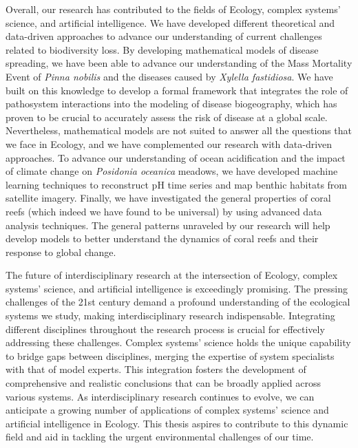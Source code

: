 Overall, our research has contributed to the fields of Ecology, complex
systems' science, and artificial intelligence. We have developed different
theoretical and data-driven approaches to advance our understanding of current
challenges related to biodiversity loss. By developing mathematical models of
disease spreading, we have been able to advance our understanding of the Mass
Mortality Event of \textit{Pinna nobilis} and the diseases caused by
\textit{Xylella fastidiosa}. We have built on this knowledge to develop a
formal framework that integrates the role of pathosystem interactions into the
modeling of disease biogeography, which has proven to be crucial to accurately
assess the risk of disease at a global scale. Nevertheless, mathematical models
are not suited to answer all the questions that we face in Ecology, and we have
complemented our research with data-driven approaches. To advance our
understanding of ocean acidification and the impact of climate change on
\textit{Posidonia oceanica} meadows, we have developed machine learning
techniques to reconstruct pH time series and map benthic habitats from
satellite imagery. Finally, we have investigated the general properties of
coral reefs (which indeed we have found to be universal) by using advanced data
analysis techniques. The general patterns unraveled by our research will help
develop models to better understand the dynamics of coral reefs and their
response to global change.

The future of interdisciplinary research at the intersection of Ecology,
complex systems' science, and artificial intelligence is exceedingly promising.
The pressing challenges of the 21st century demand a profound understanding of
the ecological systems we study, making interdisciplinary research
indispensable. Integrating different disciplines throughout the research
process is crucial for effectively addressing these challenges. Complex
systems' science holds the unique capability to bridge gaps between
disciplines, merging the expertise of system specialists with that of model
experts. This integration fosters the development of comprehensive and
realistic conclusions that can be broadly applied across various systems. As
interdisciplinary research continues to evolve, we can anticipate a growing
number of applications of complex systems' science and artificial intelligence
in Ecology. This thesis aspires to contribute to this dynamic field and aid in
tackling the urgent environmental challenges of our time.

\vfill